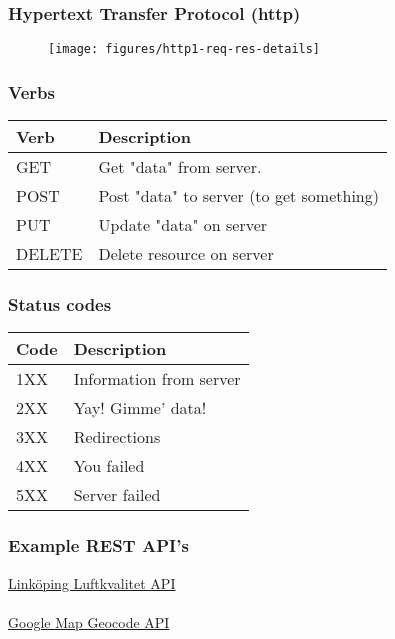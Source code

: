 \documentclass{beamer}
\begin{document}
\begin{frame}
	\frametitle{Hypertext Transfer Protocol (http)}
	\begin{center}
		\begin{figure}
			\texttt{[image: figures/http1-req-res-details]}
			\label{fig:io}
		\end{figure}
	\end{center}
\end{frame}

\begin{frame}
	\frametitle{Verbs}
	\begin{table}[t]
		\begin{center}
			\begin{tabular}{ l l }
				\textbf{Verb} & 
				\textbf{Description} \\
				\hline
				GET & Get "data" from server. \\
				POST & Post "data" to server (to get something) \\
				PUT & Update "data" on server \\
				DELETE & Delete resource on server \\
			\end{tabular}
		\end{center}
	\end{table}
\end{frame}

\begin{frame}
	\frametitle{Status codes}
	\begin{table}[t]
		\begin{center}
			\begin{tabular}{ l l }
				\textbf{Code} & 
				\textbf{Description} \\
				\hline
				1XX & Information from server \\
				2XX & Yay! Gimme' data! \\
				3XX & Redirections \\
				4XX & You failed \\
				5XX & Server failed \\
			\end{tabular}
		\end{center}
	\end{table}
\end{frame}

\begin{frame}
	\frametitle{Example REST API's}
	\begin{center}
		\href{http://www.linkoping.se/open/data/Luftkvalitet/}{Link\"{o}ping 
		Luftkvalitet API}
		 \\~\\
		\href{https://developers.google.com/maps/documentation/geocoding/intro}{Google
		 Map Geocode API} \\~\\
	\end{center}
\end{frame}
\end{document}

